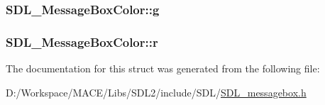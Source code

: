\subsubsection[{\texorpdfstring{g}{g}}]{ S\+D\+L\+\_\+\+Message\+Box\+Color\+::g}\hypertarget{struct_s_d_l___message_box_color_a5820adab0b32aa3eade101ea36ed6b4a}{}\label{struct_s_d_l___message_box_color_a5820adab0b32aa3eade101ea36ed6b4a}
\subsubsection[{\texorpdfstring{r}{r}}]{ S\+D\+L\+\_\+\+Message\+Box\+Color\+::r}\hypertarget{struct_s_d_l___message_box_color_a43ab2172c10058380fcf67ecc3f53184}{}\label{struct_s_d_l___message_box_color_a43ab2172c10058380fcf67ecc3f53184}


The documentation for this struct was generated from the following file\+:\begin{DoxyCompactItemize}
\item 
D\+:/\+Workspace/\+M\+A\+C\+E/\+Libs/\+S\+D\+L2/include/\+S\+D\+L/\hyperlink{_s_d_l__messagebox_8h}{S\+D\+L\+\_\+messagebox.\+h}\end{DoxyCompactItemize}
